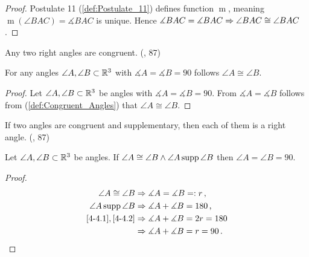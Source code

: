 \begin{proof}
  Postulate 11 (\ref{def:Postulate_11}) defines function $\operatorname{m}$, meaning $\operatorname{m}(\angle BAC)=\measuredangle BAC$ is unique.
  Hence $\measuredangle BAC = \measuredangle BAC \Rightarrow \angle BAC \cong \angle BAC$.
\end{proof}

\begin{theorem}[4-3.]\label{thm:4-3.}
  Any two right angles are congruent.
  (\cite{SMSGGeometry}, 87)

  For any angles $\angle A, \angle B \subset \mathbb{R}^3$ with $\measuredangle A=\measuredangle B=90$ follows $\angle A \cong \angle B$.
\end{theorem}

\begin{proof}
  Let $\angle A, \angle B \subset \mathbb{R}^3$ be angles with $\measuredangle A=\measuredangle B = 90$.
  From $\measuredangle A = \measuredangle B$ follows from (\ref{def:Congruent_Angles}) that $\angle A \cong \angle B$.
\end{proof}

\begin{theorem}[4-4.]\label{thm:4-4.}
  If two angles are congruent and supplementary, then each of them is a right angle.
  (\cite{SMSGGeometry}, 87)

  Let $\angle A, \angle B\subset \mathbb{R}^3$ be angles.
  If $\angle A \cong \angle B \land {\angle A}\operatorname{supp}{\angle B}$ then $\angle A= \angle B =90$.
\end{theorem}

\begin{proof}
  \begin{align}
    \angle A \cong \angle B
        &\Rightarrow \measuredangle A = \measuredangle B =:r \, \text{,} \label{4-4.1}\\
    {\angle A}\operatorname{supp}{\angle B}
        &\Rightarrow \measuredangle A + \measuredangle B = 180 \, \text{,} \label{4-4.2}\\
    \ref{4-4.1},\ref{4-4.2}
        &\Rightarrow \measuredangle A + \measuredangle B = 2r =180 \\
        &\Rightarrow \measuredangle A + \measuredangle B = r=90 \, \text{.} \\
      \end{align}
\end{proof}


